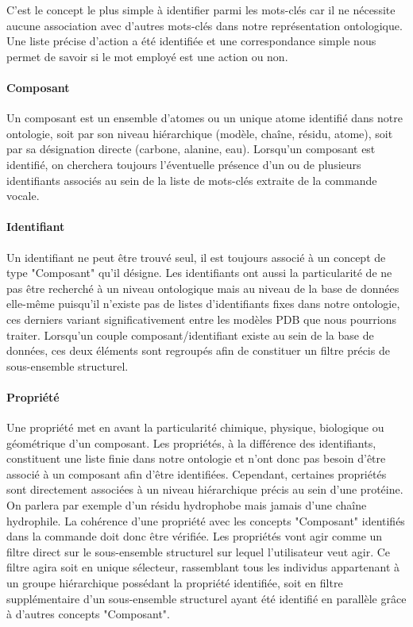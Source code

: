 C'est le concept le plus simple à identifier parmi les mots-clés car il ne nécessite aucune association avec d'autres mots-clés dans notre représentation ontologique. Une liste précise d'action a été identifiée et une correspondance simple nous permet de savoir si le mot employé est une action ou non.

\paragraph{Composant}

Un composant est un ensemble d'atomes ou un unique atome identifié dans notre ontologie, soit par son niveau hiérarchique (modèle, chaîne, résidu, atome), soit par sa désignation directe (carbone, alanine, eau). Lorsqu'un composant est identifié, on cherchera toujours l'éventuelle présence d'un ou de plusieurs identifiants associés au sein de la liste de mots-clés extraite de la commande vocale.

\paragraph{Identifiant}

Un identifiant ne peut être trouvé seul, il est toujours associé à un concept de type "Composant" qu'il désigne. Les identifiants ont aussi la particularité de ne pas être recherché à un niveau ontologique mais au niveau de la base de données elle-même puisqu'il n'existe pas de listes d'identifiants fixes dans notre ontologie, ces derniers variant significativement entre les modèles PDB que nous pourrions traiter. Lorsqu'un couple composant/identifiant existe au sein de la base de données, ces deux éléments sont regroupés afin de constituer un filtre précis de sous-ensemble structurel.

\paragraph{Propriété}

Une propriété met en avant la particularité chimique, physique, biologique ou géométrique d'un composant. Les propriétés, à la différence des identifiants, constituent une liste finie dans notre ontologie et n'ont donc pas besoin d'être associé à un composant afin d'être identifiées. Cependant, certaines propriétés sont directement associées à un niveau hiérarchique précis au sein d'une protéine. On parlera par exemple d'un résidu hydrophobe mais jamais d'une chaîne hydrophile. La cohérence d'une propriété avec les concepts "Composant" identifiés dans la commande doit donc être vérifiée. 
Les propriétés vont agir comme un filtre direct sur le sous-ensemble structurel sur lequel l'utilisateur veut agir. Ce filtre agira soit en unique sélecteur, rassemblant tous les individus appartenant à un groupe hiérarchique possédant la propriété identifiée, soit en filtre supplémentaire d'un sous-ensemble structurel ayant été identifié en parallèle grâce à d'autres concepts "Composant".

